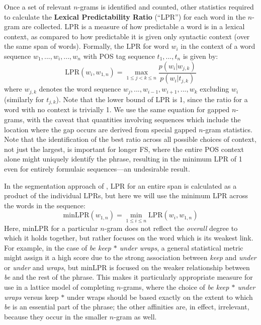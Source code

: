 \documentclass[11pt,letterpaper]{article}
\newcommand{\gap}{$*$\xspace}
\newcommand{\ex}[1]{\textit{#1}\xspace}
\newcommand{\termdef}[1]{\textbf{#1}\xspace}
\newcommand{\LPR}{\ensuremath{\text{LPR}}}
\newcommand{\minLPR}{\ensuremath{\text{minLPR}}}
\begin{document}
Once a set of relevant $n$-grams is identified and counted, other statistics required to calculate the \termdef{Lexical Predictability Ratio} (``LPR'') for each word in the $n$-gram are collected. LPR is a measure of how predictable a word is in a lexical context, as compared to how predictable it is given only syntactic context (over the same span of words). Formally, the LPR for word $w_i$ in the context of a word sequence $w_1,..., w_i, ..., w_{n}$ with POS tag sequence $t_1, ..., t_{n}$ is given by:
\begin{displaymath}
\LPR(w_i,w_{1,n}) = \max_{1 \leq j < k \leq n }{\frac{p(w_i|w_{j,k})}{p(w_i|t_{j,k})}}
\end{displaymath}
where $w_{j,k}$ denotes the word sequence $w_j,..., w_{i-1}, w_{i+1}, ..., w_{k}$ excluding $w_{i}$ (similarly for $t_{j,k}$). Note that the lower bound of LPR is 1, since the ratio for a word with no context is trivially 1. We use the same equation for gapped $n$-grams, with the caveat that quantities involving sequences which include the location where the gap occurs are derived from special gapped $n$-gram statistics. Note that the identification of the best ratio across all possible choices of context, not just the largest, is important for longer FS, where the entire POS context alone might uniquely identify the phrase, resulting in the minimum LPR of 1 even for entirely formulaic sequences---an undesirable result. 


In the segmentation approach of , LPR for an entire span is calculated as a product of the individual LPRs, but here we will use the minimum LPR across the words in the sequence:
\begin{displaymath}
\minLPR(w_{1,n}) = \min_{1 \leq i \leq n }{\LPR(w_i,w_{1,n})}
\end{displaymath}
Here, minLPR for a particular $n$-gram does not reflect the \emph{overall} degree to which it holds together, but rather focuses on the word which is its weakest link. For example, in the case of \ex{be keep \gap under wraps}, a general statistical metric might assign it a high score due to the strong association between \ex{keep} and \ex{under} or \ex{under} and \ex{wraps}, but minLPR is focused on the weaker relationship between \ex{be} and the rest of the phrase. This makes it particularly appropriate measure for use in a lattice model of completing $n$-grams, where the choice of \ex{be keep \gap under wraps} versus {keep \gap under wraps} should be based exactly on the extent to which \ex{be} is an essential part of the phrase; the other affinities are, in effect, irrelevant, because they occur in the smaller $n$-gram as well.  
\end{document}
